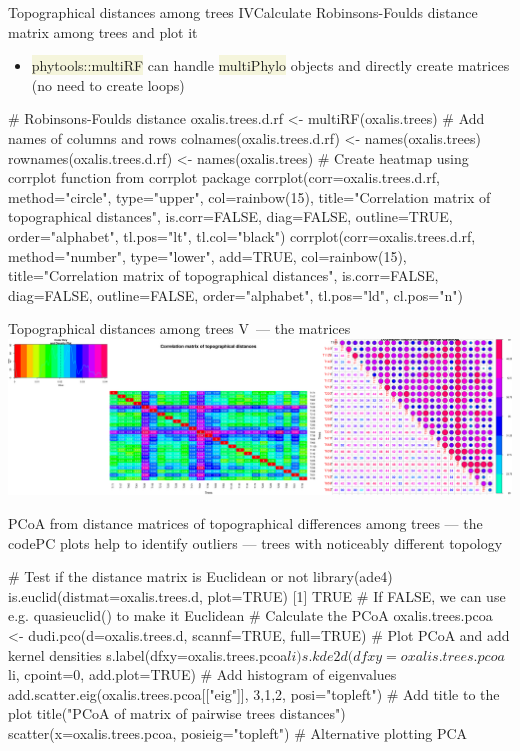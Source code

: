 \documentclass[compress, ucs, xelatex, 11pt, xcolor=svgnames, aspectratio=169,
	hyperref={
		bookmarks=true,
		unicode=true,
		colorlinks=true,
		pdftitle={Molecular data in R},
		plainpages=false,
		pdfauthor={Vojtech Zeisek},
		pdfsubject={Course about phylogeny and evolution in R},
		pdfcreator={XeLaTeX},
		pdfkeywords={R, evolution, phylogeny, molecular data},
		linkcolor=Crimson, %
		anchorcolor=Magenta, %
		citecolor=Magenta, %
		filecolor=Magenta, %
		menucolor=Magenta, %
		urlcolor=DodgerBlue, %
		pdftex},
	url={hyphens, lowtilde} %
	]{beamer}
\renewcommand{\texttt}[1]{\colorbox{Beige}{{\ttfamily #1}}}
\begin{document}
\begin{frame}[fragile]{Topographical distances among trees IV}{Calculate Robinsons-Foulds distance matrix among trees and plot it}
	\begin{itemize}
		\item \texttt{phytools::multiRF} can handle \texttt{multiPhylo} objects and directly create matrices (no need to create loops)
	\end{itemize}
	\begin{spluscode}
    # Robinsons-Foulds distance
    oxalis.trees.d.rf <- multiRF(oxalis.trees)
    # Add names of columns and rows
    colnames(oxalis.trees.d.rf) <- names(oxalis.trees)
    rownames(oxalis.trees.d.rf) <- names(oxalis.trees)
    # Create heatmap using corrplot function from corrplot package
    corrplot(corr=oxalis.trees.d.rf, method="circle", type="upper",
      col=rainbow(15), title="Correlation matrix of topographical
      distances", is.corr=FALSE, diag=FALSE, outline=TRUE,
      order="alphabet", tl.pos="lt", tl.col="black")
    corrplot(corr=oxalis.trees.d.rf, method="number", type="lower",
      add=TRUE, col=rainbow(15), title="Correlation matrix of
      topographical distances", is.corr=FALSE, diag=FALSE,
      outline=FALSE, order="alphabet", tl.pos="ld", cl.pos="n")
	\end{spluscode}
\end{frame}

\begin{frame}{Topographical distances among trees V~--- the matrices}
	\includegraphics[width=\textwidth]{oxalis-dist.png}
\end{frame}

\begin{frame}[fragile]{PCoA from distance matrices of topographical differences among trees --- the code}{PC plots help to identify outliers --- trees with noticeably different topology}
	\begin{spluscode}
    # Test if the distance matrix is Euclidean or not
    library(ade4)
    is.euclid(distmat=oxalis.trees.d, plot=TRUE)
    [1] TRUE # If FALSE, we can use e.g. quasieuclid() to make it Euclidean
    # Calculate the PCoA
    oxalis.trees.pcoa <- dudi.pco(d=oxalis.trees.d, scannf=TRUE, full=TRUE)
    # Plot PCoA and add kernel densities
    s.label(dfxy=oxalis.trees.pcoa$li)
    s.kde2d(dfxy=oxalis.trees.pcoa$li, cpoint=0, add.plot=TRUE)
    # Add histogram of eigenvalues
    add.scatter.eig(oxalis.trees.pcoa[["eig"]], 3,1,2, posi="topleft")
    # Add title to the plot
    title("PCoA of matrix of pairwise trees distances")
    scatter(x=oxalis.trees.pcoa, posieig="topleft") # Alternative plotting PCA
	\end{spluscode}
\end{frame}
\end{document}
